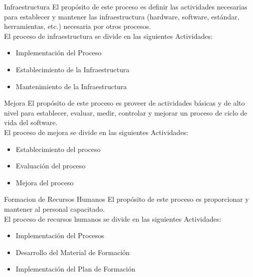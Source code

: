 \documentclass{beamer}
\begin{document}
			\begin{frame}{Infraestructura}
				El propósito de este proceso es definir las actividades necesarias para establecer y mantener las infraestructura (hardware, software, estándar, herramientas, etc.) necesaria por otros procesos.\\
				
				El proceso de infraestructura se divide en las siguientes Actividades:
				\begin{itemize}
					\item Implementación del Proceso
					\item Establecimiento de la Infraestructura
					\item Mantenimiento de la Infraestructura
				\end{itemize}
			\end{frame}
			
			\begin{frame}{Mejora}
				El propósito de este proceso es proveer de actividades básicas y de alto nivel para establecer, evaluar, medir, controlar y mejorar un proceso de ciclo de vida del software.\\
				
				El proceso de mejora se divide en las siguientes Actividades:
				\begin{itemize}
					\item Establecimiento del proceso
					\item Evaluación del proceso
					\item Mejora del proceso
				\end{itemize}
			\end{frame}
			
			\begin{frame}{Formacion de Recursos Humanos}
				El propósito de este proceso es proporcionar y mantener al personal capacitado.\\
				
				El proceso de recursos humanos se divide en las siguientes Actividades:
				\begin{itemize}
					\item Implementación del Procesos
					\item Desarrollo del Material de Formación
					\item Implementación del Plan de Formación 
				\end{itemize} 
			\end{frame}
			
			
\end{document}

